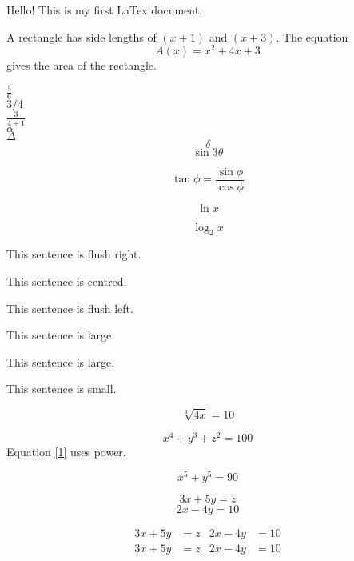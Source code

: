 \documentclass[12pt]{article}
\begin{document}
Hello! This is my first LaTex document.

A rectangle has side lengths of $(x+1)$ and $(x+3)$.
The equation $$A(x)=x^2+4x+3$$ gives the area of the rectangle.

$\frac{5}{6}$\\
$3/4$\\
$\displaystyle{\frac{3}{4+1}}$\\
$\alpha$\\
$\Delta$\\
$$\delta$$
$$\sin 3\theta$$

$$\tan \phi=\frac{\sin \phi}{\cos \phi}$$

$$\ln x$$

$$\log_2 x$$

\begin{flushright}
This sentence is flush right.
\end{flushright}

\begin{center}
This sentence is centred.
\end{center}

\begin{flushleft}
This sentence is flush left.
\end{flushleft}

\begin{large}
This sentence is large.
\end{large}

\begin{Large}
This sentence is large.
\end{Large}

\begin{small}
This sentence is small.
\end{small}

\begin{equation}\label{0}
\sqrt[3]{4x}=10
\end{equation}

\begin{equation}\label{1}
x^4+y^3+z^2=100
\end{equation}
Equation \ref {1} uses power.

\begin{equation*}\tag{ EQ5}
x^5+y^5=90
\end{equation*}

\[3x+5y=z\]
\[2x-4y=10\]

\begin{align*}
3x+5y &= z		& 2x-4y &= 10\\
3x+5y &= z	 	& 2x-4y &= 10
\end{align*}
\end{document}
